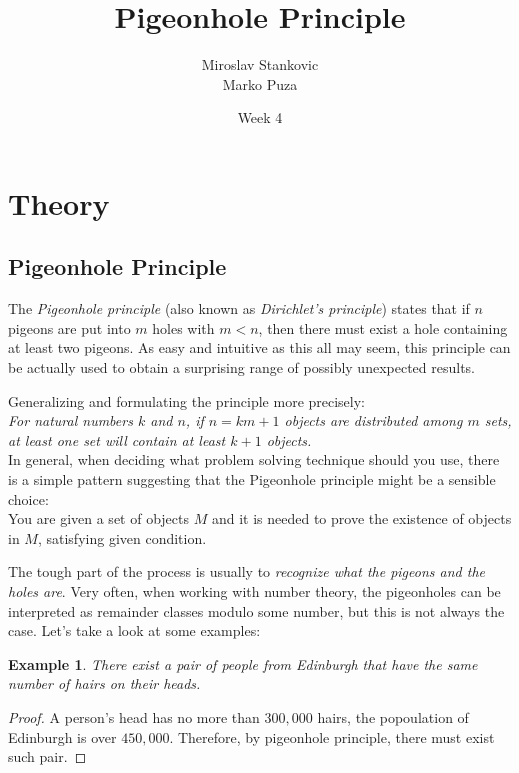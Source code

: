 \documentclass[11pt,a5paper]{article}
\title{\textbf{Pigeonhole Principle}}
\date{Week 4}
\author{Miroslav Stankovic\\ Marko Puza}
\newtheorem{theorem}{Example}
\begin{document}
\maketitle

\section{Theory}
\subsection*{Pigeonhole Principle}

The \emph{Pigeonhole principle} (also known as \emph{Dirichlet's principle}) states that if $n$ pigeons are put into $m$ holes with $m < n$, then there must exist a hole containing at least two pigeons. As easy and intuitive as this all may seem, this principle can be actually used to obtain a surprising range of possibly unexpected results.

Generalizing and formulating the principle more precisely: \\
\emph{For natural numbers $k$ and $n$, if $n = km + 1$ objects are distributed among $m$ sets, at least one set will contain at least $k + 1$ objects.}
\\

In general, when deciding what problem solving technique should you use, there is a simple pattern suggesting that the Pigeonhole principle might be a sensible choice:\\
You are given a set of objects $M$ and it is needed to prove the existence of objects in $M$, satisfying given condition. 

The tough part of the process is usually to \emph{recognize what the pigeons and the holes are}. Very often, when working with number theory, the pigeonholes can be interpreted as remainder classes modulo some number, but this is not always the case. Let's take a look at some examples:


\begin{theorem}
There exist a pair of people from Edinburgh that have the same number of hairs on their heads.
\end{theorem}
\begin{proof}
A person's head has no more than $300,000$ hairs, the popoulation of Edinburgh is over $450,000$. Therefore, by pigeonhole principle, there must exist such pair.
\end{proof}
\end{document}
